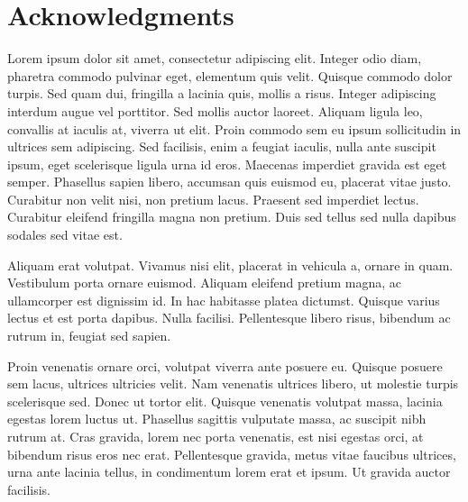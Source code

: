 \section*{Acknowledgments}

Lorem ipsum dolor sit amet, consectetur adipiscing elit. Integer odio diam, pharetra commodo pulvinar eget, elementum quis velit. Quisque commodo dolor turpis. Sed quam dui, fringilla a lacinia quis, mollis a risus. Integer adipiscing interdum augue vel porttitor. Sed mollis auctor laoreet. Aliquam ligula leo, convallis at iaculis at, viverra ut elit. Proin commodo sem eu ipsum sollicitudin in ultrices sem adipiscing. Sed facilisis, enim a feugiat iaculis, nulla ante suscipit ipsum, eget scelerisque ligula urna id eros. Maecenas imperdiet gravida est eget semper. Phasellus sapien libero, accumsan quis euismod eu, placerat vitae justo. Curabitur non velit nisi, non pretium lacus. Praesent sed imperdiet lectus. Curabitur eleifend fringilla magna non pretium. Duis sed tellus sed nulla dapibus sodales sed vitae est.

Aliquam erat volutpat. Vivamus nisi elit, placerat in vehicula a, ornare in quam. Vestibulum porta ornare euismod. Aliquam eleifend pretium magna, ac ullamcorper est dignissim id. In hac habitasse platea dictumst. Quisque varius lectus et est porta dapibus. Nulla facilisi. Pellentesque libero risus, bibendum ac rutrum in, feugiat sed sapien.

Proin venenatis ornare orci, volutpat viverra ante posuere eu. Quisque posuere sem lacus, ultrices ultricies velit. Nam venenatis ultrices libero, ut molestie turpis scelerisque sed. Donec ut tortor elit. Quisque venenatis volutpat massa, lacinia egestas lorem luctus ut. Phasellus sagittis vulputate massa, ac suscipit nibh rutrum at. Cras gravida, lorem nec porta venenatis, est nisi egestas orci, at bibendum risus eros nec erat. Pellentesque gravida, metus vitae faucibus ultrices, urna ante lacinia tellus, in condimentum lorem erat et ipsum. Ut gravida auctor facilisis.
